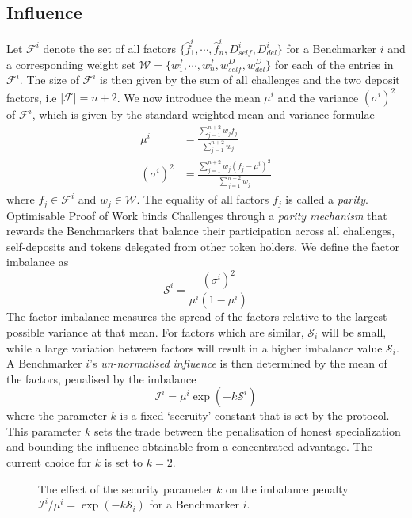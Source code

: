 \documentclass{contract}
\def\f{\hat{f}}
\numberwithin{equation}{section}
\begin{document}
\subsection{Influence}
\label{sec:influence}

Let $\mathcal{F}^i$ denote the set of all factors $\lbrace \f_1^i,\cdots,\f_n^i,D^i_{self},D^i_{del}\rbrace$ for a Benchmarker $i$ and a corresponding weight set $\mathcal{W} = \lbrace w_1^f,\cdots,w_n^f,w^D_{self},w^D_{del}\rbrace$ for each of the entries in $\mathcal{F}^i$.
The size of $\mathcal{F}^i$ is then given by the sum of all challenges and the two deposit factors, i.e $|\mathcal{F}| = n + 2$.  
We now introduce the mean $\mu^i$ and the variance $(\sigma^i)^2$ of $\mathcal{F}^i$, which is given by the standard weighted mean and variance formulae
\begin{align}
       \mu^i &= \frac{\sum_{j=1}^{n+2}w_j f_j}{\sum_{j=1}^{n+2}w_j}\\[2pt]
       (\sigma^i)^2 &= \frac{\sum_{j=1}^{n+2}w_j(f_j - \mu^i)^2 }{\sum_{j=1}^{n+2}w_j}
\end{align}
where $f_j \in \mathcal{F}^i$ and $w_j \in \mathcal{W}$. 
The equality of all factors $f_j$ is called a \emph{parity}. 
Optimisable Proof of Work binds Challenges through a \emph{parity mechanism} that rewards the Benchmarkers that balance their participation across all challenges, self-deposits and tokens delegated from other token holders.
We define the factor imbalance as 
\begin{equation}
    \mathcal{S}^i = \frac{(\sigma^i)^2}{\mu^i(1 - \mu^i)}
\end{equation}
The factor imbalance measures the spread of the factors relative to the largest possible variance at that mean. 
For factors which are similar, $\mathcal{S}_i$ will be small, while a large variation between factors will result in a higher imbalance value $\mathcal{S}_i$. 
A Benchmarker $i$'s \emph{un-normalised influence} is then determined by the mean of the factors, penalised by the imbalance
\begin{equation}
    \mathcal{I}^i = \mu^i \exp(-k\mathcal{S}^i)
\end{equation}
where the parameter $k$ is a fixed `secruity' constant that is set by the protocol.
This parameter $k$ sets the trade between the penalisation of honest specialization and bounding the influence obtainable from a concentrated advantage. 
The current choice for $k$ is set to $k=2$.

\begin{figure}
    \centering
    
    \caption{The effect of the security parameter $k$ on the imbalance penalty $\mathcal{I}^i / \mu^i = \exp(-k \mathcal{S}_i)$ for a Benchmarker $i$.}
    \label{fig:imbalance-penalty}
\end{figure}
\end{document}
